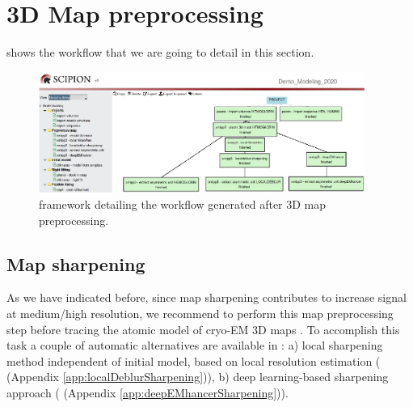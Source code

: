 \section{3D Map preprocessing}
 shows the \scipion workflow that we are going to detail in this section.

 \begin{figure}[H]
  \centering 
  \captionsetup{width=.9\linewidth} 
  \includegraphics[width=0.95\textwidth]
  {Images/Fig62}
  \caption{\scipion framework detailing the workflow generated after 3D map preprocessing.}
  \label{fig:scipion_workflow_import_2}
  \end{figure}

\subsection*{Map sharpening}
As we have indicated before, since map sharpening contributes to increase  signal at medium/high resolution, we recommend to perform this map preprocessing step before tracing the atomic model of cryo-EM  3D maps \citep{ramirez2018}.  To accomplish this task a couple of automatic alternatives are available in \scipion:  a) local sharpening method independent of initial model, based on local resolution estimation  ( \citep{ramirez2018} (Appendix \ref{app:localDeblurSharpening})), b) deep learning-based sharpening approach ( \citep{Sanchez-Garcia2020.06.12.148296} (Appendix \ref{app:deepEMhancerSharpening})). 

